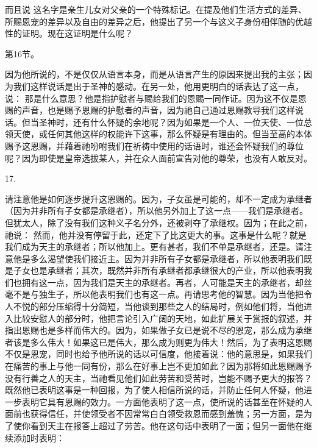 而且说 这名字是亲生儿女对父亲的一个特殊标记。在提及他们生活方式的差异、所赐恩宠的差异以及自由的差异之后，他提出了另一个与这义子身份相伴随的优越性的证明。现在这证明是什么呢？\par

第16节。\par

因为他所说的，不是仅仅从语言本身，而是从语言产生的原因来提出我的主张；因为我们这样说话是出于圣神的感动。在另一处，他用更明白的话表达了这一点，说： 那是什么意思？他是指护慰者与赐给我们的恩赐一同作证。因为这不仅是恩赐的声音，也是赐予恩赐的护慰者的声音，因为祂自己通过恩赐教导我们这样说话。但当圣神时，还有什么怀疑的余地呢？因为如果是一个人、一位天使、一位总领天使，或任何其他这样的权能许下这事，那么怀疑是有理由的。但当至高的本体赐予这恩赐，并藉着祂吩咐我们在祈祷中使用的话语时，谁还会怀疑我们的尊位呢？因为即使是皇帝选拔某人，并在众人面前宣告对他的尊荣，也没有人敢反对。\par

17.  \par

请注意他是如何逐步提升这恩赐的。因为，子女虽是可能的，却不一定成为承继者（因为并非所有子女都是承继者），所以他另外加上了这一点——我们是承继者。但犹太人，除了没有我们这种义子名分外，还被剥夺了承继权。因为；在此之前，祂说： 然而，他并没有停留于此，还定下了比这更大的事。这事是什么呢？就是我们成为天主的承继者；所以他加上。更有甚者，我们不单是承继者，还是。请注意他是多么渴望使我们接近主。因为并非所有子女都是承继者，所以他表明我们既是子女也是承继者；其次，既然并非所有承继者都承继很大的产业，所以他表明我们也拥有这一点，因为我们是天主的承继者。再者，人可能是天主的承继者，却丝毫不是与独生子，所以他表明我们也有这一点。再请思考他的智慧。因为当他把令人不悦的部分压缩得十分简短，当他谈到那些之人的结局时，例如他们将，当他进入比较安慰人的部分时，他把言论引入广阔的天地，如此扩展关于赏报的叙述，并指出恩赐也是多样而伟大的。因为，如果做子女已是说不尽的恩宠，那么成为承继者该是多么伟大！如果这已是伟大，那么成为则更为伟大！然后，为了表明这恩赐不仅是恩宠，同时也给予他所说的话以可信度，他接着说：他的意思是，如果我们在痛苦的事上与他一同有份，那么在好事上岂不更加如此？因为那将如此恩赐赐予没有行善之人的天主，当祂看见他们如此劳苦和受苦时，岂能不赐予更大的报答？既然他已表明这事是一种回报，为了使人相信所说的话，并防止任何人怀疑，他进一步表明它具有恩赐的效力。一方面他表明了这一点，使所说的话甚至在怀疑的人面前也获得信任，并使领受者不因常常白白领受救恩而感到羞愧；另一方面，是为了使你看到天主在报答上超过了劳苦。他在这句话中表明了一面；但另一面他在继续添加时表明：\par


